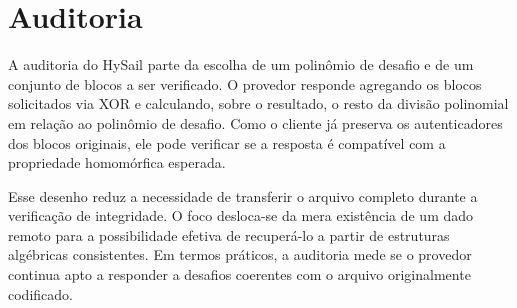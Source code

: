 \section{Auditoria}%
A auditoria do HySail parte da escolha de um polinômio de desafio e de um conjunto de blocos a ser verificado. O provedor responde agregando os blocos solicitados via XOR e calculando, sobre o resultado, o resto da divisão polinomial em relação ao polinômio de desafio. Como o cliente já preserva os autenticadores dos blocos originais, ele pode verificar se a resposta é compatível com a propriedade homomórfica esperada.

Esse desenho reduz a necessidade de transferir o arquivo completo durante a verificação de integridade. O foco desloca-se da mera existência de um dado remoto para a possibilidade efetiva de recuperá-lo a partir de estruturas algébricas consistentes. Em termos práticos, a auditoria mede se o provedor continua apto a responder a desafios coerentes com o arquivo originalmente codificado.

